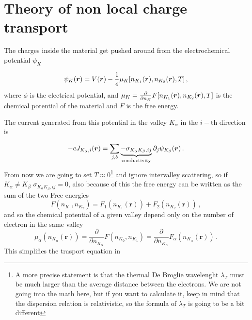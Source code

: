 \section{Theory of non local charge transport}

The charges inside the material get pushed around from the electrochemical potential $\psi_K$


\begin{equation}
    \psi_{K}(\boldsymbol{r})= V(\boldsymbol{r})-\frac 1e \mu_K[n_{K_1}(\boldsymbol{r}),n_{K_2}(\boldsymbol{r}),T]\,,
\end{equation}
where $\phi$ is the electrical potential, and $\mu_K=\frac {\partial}{\partial n_{K}}F[n_{K_1}(\boldsymbol{r}),n_{K_2}(\boldsymbol{r}),T]$ is the chemical potential of the material and $F$ is the free energy.

The current generated from this potential in the valley $K_\alpha$ in the $i-$th direction is

\begin{equation}
    -eJ_{K_\alpha,i}(\boldsymbol{r})= \sum_{j,b} \underbrace{-\sigma_{K_\alpha K_\beta ,ij}}_{\textrm{conductivity}}\partial_j\psi_{K_\beta }(\boldsymbol{r})\,.
\end{equation}
From now we are going to set $T\approx 0$\footnote{A more precise statement is that the thermal De Broglie wavelenght $\lambda_T$ must be much larger than the average distance between the electrons. We are not going into the math here, but if you want to calculate it, keep in mind that the dispersion relation is relativistic, so the formula of $\lambda_T$ is going to be a bit different}
and ignore intervalley scattering, so if $K_\alpha \neq K_\beta $ $\sigma_{K_\alpha K_\beta ,ij}=0$, also because of this the free energy can be written as the sum of the two Free energies
\begin{equation}
    F(n_{K_1},n_{K_2})=F_1(n_{K_1}(\mathbf r))+F_2(n_{K_2}(\mathbf r))\,,
\end{equation}
and so the chemical potential of a given valley depend only on the number of electron in the same valley
\begin{equation}
    \mu_\alpha(n_{K_\alpha}(\mathbf r))=\frac{\partial}{\partial n_{K_\alpha}}F(n_{K_0},n_{K_1})=\frac{\partial}{\partial n_{K_\alpha}}F_\alpha(n_{K_\alpha}(\mathbf r))\,.
\end{equation}
This simplifies the trasport equation in 


